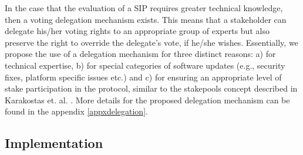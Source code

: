 In the case that the evaluation of a SIP requires greater technical knowledge, then a voting delegation mechanism exists. This means that a stakeholder can delegate his/her voting rights to an appropriate group of experts but also preserve the right to override the delegate's vote, if he/she wishes. Essentially, we propose the use of a delegation mechanism for three distinct reasons: a) for technical expertise, b) for special categories of software updates (e.g., security fixes, platform specific issues etc.) and c) for ensuring an appropriate level of stake participation in the protocol, similar to the stakepools concept described in Karakostas et. al. \cite{stakepools}. More details for the proposed delegation mechanism can be found in the appendix \ref{appxdelegation}.



\subsection{Implementation}

